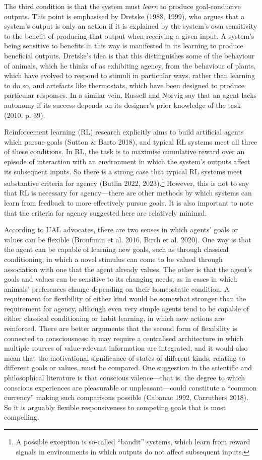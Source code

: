\documentclass[12pt]{article}
\begin{document}
The third condition is that the system must \textit{learn} to produce goal-conducive outputs. This point is emphasised by Dretske (1988, 1999), who argues that a system’s output is only an action if it is explained by the system’s own sensitivity to the benefit of producing that output when receiving a given input. A system’s being sensitive to benefits in this way is manifested in its learning to produce beneficial outputs. Dretske’s idea is that this distinguishes some of the behaviour of animals, which he thinks of as exhibiting agency, from the behaviour of plants, which have evolved to respond to stimuli in particular ways, rather than learning to do so, and artefacts like thermostats, which have been designed to produce particular responses. In a similar vein, Russell and Norvig say that an agent lacks autonomy if its success depends on its designer’s prior knowledge of the task (2010, p. 39).

Reinforcement learning (RL) research explicitly aims to build artificial agents which pursue goals (Sutton \& Barto 2018), and typical RL systems meet all three of these conditions. In RL, the task is to maximise cumulative reward over an episode of interaction with an environment in which the system’s outputs affect its subsequent inputs. So there is a strong case that typical RL systems meet substantive criteria for agency (Butlin 2022, 2023).\footnote{A possible exception is so-called ``bandit'' systems, which learn from reward signals in environments in which outputs do not affect subsequent inputs.} However, this is not to say that RL is necessary for agency—there are other methods by which systems can learn from feedback to more effectively pursue goals. It is also important to note that the criteria for agency suggested here are relatively minimal.

According to UAL advocates, there are two senses in which agents’ goals or values can be flexible (Bronfman et al. 2016, Birch et al. 2020). One way is that the agent can be capable of learning new goals, such as through classical conditioning, in which a novel stimulus can come to be valued through association with one that the agent already values. The other is that the agent’s goals and values can be sensitive to its changing needs, as in cases in which animals’ preferences change depending on their homeostatic condition. A requirement for flexibility of either kind would be somewhat stronger than the requirement for agency, although even very simple agents tend to be capable of either classical conditioning or habit learning, in which new actions are reinforced. There are better arguments that the second form of flexibility is connected to consciousness: it may require a centralised architecture in which multiple sources of value-relevant information are integrated, and it would also mean that the motivational significance of states of different kinds, relating to different goals or values, must be compared. One suggestion in the scientific and philosophical literature is that conscious valence—that is, the degree to which conscious experiences are pleasurable or unpleasant—could constitute a ``common currency'' making such comparisons possible (Cabanac 1992, Carruthers 2018). So it is arguably flexible responsiveness to competing goals that is most compelling.
\end{document}
